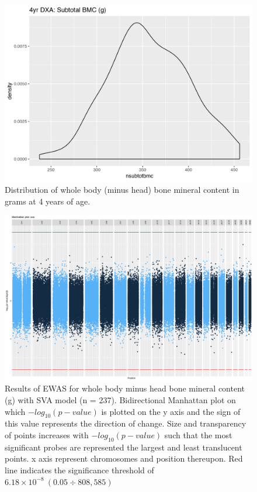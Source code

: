 \documentclass[
]{book}
\begin{document}
\begin{figure}

{\centering \includegraphics[width=0.8\linewidth]{figs/MAVIDOSIInsubtotbmc} 

}

\caption{Distribution of whole body (minus head) bone mineral content in grams at 4 years of age.}\label{fig:MAVIDOSIInsubtotbmc}
\end{figure}



\begin{figure}

{\centering \includegraphics[width=0.8\linewidth]{figs/MAVIDOSIInsubtotbmcEPICewasManhattanSVA} 

}

\caption{Results of EWAS for whole body minus head bone mineral content (g) with SVA model (n = 237). Bidirectional Manhattan plot on which \(-log_{10}(p-value)\) is plotted on the y axis and the sign of this value represents the direction of change. Size and transparency of points increases with \(-log_{10}(p-value)\) such that the most significant probes are represented the largest and least translucent points. x axis represent chromosomes and position thereupon. Red line indicates the significance threshold of \(6.18\times10^{-8}~(0.05\div808,585)\)}\label{fig:MAVIDOSIInsubtotbmcEPICewasManhattanSVA}
\end{figure}
\end{document}
